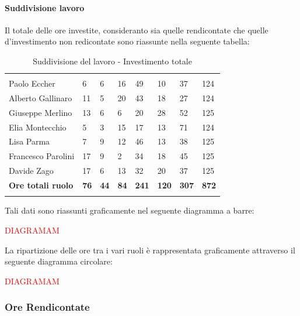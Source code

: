 			\paragraph{Suddivisione lavoro} \Spazio
			Il totale delle ore investite, consideranto sia quelle rendicontate che quelle d'investimento non redicontate sono riassunte nella seguente tabella:
					\begin{table}[H]
			\centering
			\begin{tabular}{|C{4cm}|C{0.6cm}|C{0.6cm}|C{0.6cm}|C{0.6cm}|C{0.6cm}|C{0.6cm}|C{3cm}|}
				 & & &&&&&\\
				Paolo Eccher 		& 6  & 6 & 16 & 49 & 10 & 37 & 124 \\
				Alberto Gallinaro 	& 11 & 5 & 20 & 43 & 18 & 27 & 124 \\
				Giuseppe Merlino 	& 13 & 6 & 6  & 20 & 28 & 52 & 125 \\
				Elia Montecchio 	& 5 & 3 & 15 & 17 & 13 & 71 & 124 \\
				Lisa Parma 			& 7 & 9 & 12 & 46 & 13 & 38 & 125 \\
				Francesco Parolini 	& 17 & 9 & 2 & 34 & 18 & 45 & 125 \\
				Davide Zago 		& 17 & 6 & 13 & 32 & 20 & 37 & 125 \\
				
				\textbf{Ore totali ruolo}  & \textbf{76} & \textbf{44} & \textbf{84} & \textbf{241} & \textbf{120} & \textbf{307} & \textbf{872} \\
			\end{tabular}
			\caption{Suddivisione del lavoro - Investimento totale }
			\end{table}
		
			Tali dati sono riassunti graficamente nel seguente diagramma a barre:
			
			\textcolor{red}{DIAGRAMAM}
			
			La ripartizione delle ore tra i vari ruoli è rappresentata graficamente 
			attraverso il seguente diagramma circolare:
			
			\textcolor{red}{DIAGRAMAM}
			
			\subsubsection{Ore Rendicontate}
			
